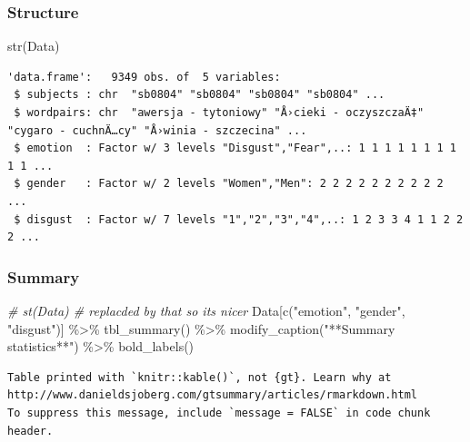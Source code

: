\documentclass[
]{article}
\newenvironment{Shaded}{\begin{snugshade}}{\end{snugshade}}
\newcommand{\CommentTok}[1]{\textcolor[rgb]{0.56,0.35,0.01}{\textit{#1}}}
\newcommand{\FunctionTok}[1]{\textcolor[rgb]{0.00,0.00,0.00}{#1}}
\newcommand{\NormalTok}[1]{#1}
\newcommand{\SpecialCharTok}[1]{\textcolor[rgb]{0.00,0.00,0.00}{#1}}
\newcommand{\StringTok}[1]{\textcolor[rgb]{0.31,0.60,0.02}{#1}}
\begin{document}
\hypertarget{structure}{%
\subsubsection{Structure}\label{structure}}

\begin{Shaded}
\begin{Highlighting}[]
\FunctionTok{str}\NormalTok{(Data)}
\end{Highlighting}
\end{Shaded}

\begin{verbatim}
'data.frame':   9349 obs. of  5 variables:
 $ subjects : chr  "sb0804" "sb0804" "sb0804" "sb0804" ...
 $ wordpairs: chr  "awersja - tytoniowy" "Å›cieki - oczyszczaÄ‡" "cygaro - cuchnÄ…cy" "Å›winia - szczecina" ...
 $ emotion  : Factor w/ 3 levels "Disgust","Fear",..: 1 1 1 1 1 1 1 1 1 1 ...
 $ gender   : Factor w/ 2 levels "Women","Men": 2 2 2 2 2 2 2 2 2 2 ...
 $ disgust  : Factor w/ 7 levels "1","2","3","4",..: 1 2 3 3 4 1 1 2 2 2 ...
\end{verbatim}

\hypertarget{summary}{%
\subsubsection{Summary}\label{summary}}

\begin{Shaded}
\begin{Highlighting}[]
\CommentTok{\# st(Data) \# replacded by that so its nicer}
\NormalTok{Data[}\FunctionTok{c}\NormalTok{(}\StringTok{"emotion"}\NormalTok{, }\StringTok{"gender"}\NormalTok{, }\StringTok{"disgust"}\NormalTok{)] }\SpecialCharTok{\%\textgreater{}\%}  \FunctionTok{tbl\_summary}\NormalTok{()  }\SpecialCharTok{\%\textgreater{}\%} \FunctionTok{modify\_caption}\NormalTok{(}\StringTok{"**Summary statistics**"}\NormalTok{) }\SpecialCharTok{\%\textgreater{}\%} \FunctionTok{bold\_labels}\NormalTok{()}
\end{Highlighting}
\end{Shaded}

\begin{verbatim}
Table printed with `knitr::kable()`, not {gt}. Learn why at
http://www.danieldsjoberg.com/gtsummary/articles/rmarkdown.html
To suppress this message, include `message = FALSE` in code chunk header.
\end{verbatim}
\end{document}
